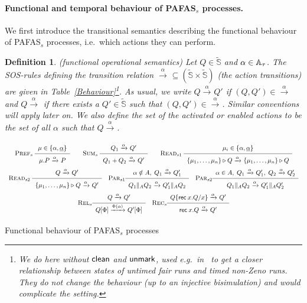 \documentclass[copyright,creativecommons]{eptcs}
\newtheorem{definition}[theorem]{Definition}
\def\name#1{\mbox{\sc #1}}
\def\sos#1#2{{\def\arraystretch{1.6}\begin{array}{c}#1\\\hline
#2\end{array}}}
\newcommand{\rec}{{\sf rec} \:}
\newcommand{\nar}[2]{\xrightarrow{#1}_{#2}}
\newcommand{\Sg}{\tilde{\SG}}
\newcommand{\SG}{{\mathbb S}}
\newcommand{\clean}{{\sf clean}}
\newcommand{\unlab}{{\sf unmark}}
\newcommand{\rop}{\triangleright}
\begin{document}
\paragraph{Functional and temporal behaviour of PAFAS$_s$ processes.}
\label{secTimedSem}
We first introduce the transitional semantics describing the functional
behaviour of PAFAS$_s$ processes, i.e.\ which actions they can perform.
\begin{definition}\label{PACTSOS}\rm({\em functional operational
semantics})
Let $Q\in \Sg$ and $\alpha \in {\mathbb A}_{\tau}$. The SOS-rules defining the transition
relation  $\nar{\alpha}{}\subseteq(\Sg \times \Sg)$ (the {\em action
transitions}) are given in Table~\ref{Behaviour}\footnote{We do here
without $\clean$ and $\unlab$, used e.g.\ in~\cite{CDV06} to get
a closer relationship between states of untimed fair runs and timed
non-Zeno runs. They do not change the behaviour (up to an injective
bisimulation) and would complicate the setting.}. As usual, we write
$Q\nar{\alpha}{}Q'$ if $(Q,Q')\in\nar{\alpha}{}$ and $Q\nar{\alpha}{}$ if
there exists a $Q'\in \Sg$ such that $(Q,Q')\in\nar{\alpha}{}$. Similar
conventions will apply later on. We also define the set of the {\em
activated} or enabled actions to be the set of all $\alpha$ such that
$Q \nar{\alpha}{}$.
\end{definition}

\vspace{-0.8cm}
\begin{table}[tbh]
\small
\[
\begin{array}{c}
\name{Pref$_s$}\; \sos{\mu\in\{\alpha, \underline{\alpha}\}}
{\mu.P \nar{\alpha}{}P}\qquad 
\name{Sum$_s$}\; \sos{Q_1\nar{\alpha}{}Q'}{Q_1+Q_2
\nar{\alpha}{} Q'}  \qquad 
\name{Read$_{s1}$}\; \sos{ \mu_i \in \{\alpha, \underline{\alpha}\}}
{\{\mu_1, \ldots, \mu_n\} \rop Q \nar{\alpha}{} \{\mu_1, \ldots,
\mu_n\} \rop Q} \\
\name{Read$_{s2}$}\; \sos{Q \nar{\alpha}{} Q'} {\{\mu_1, \ldots, \mu_n\}
\rop Q \nar{\alpha}{} Q'}  \quad 
\name{Par$_{s1}$} \sos{\alpha\notin A,\;Q_1\nar{\alpha}{}Q'_1}
{Q_1\|_A Q_2 \nar{\alpha}{} Q'_1\|_A Q_2}\quad
\name{Par$_{s2}$} \sos{\alpha\in A,\;Q_1\nar{\alpha}{}Q'_1,\;
Q_2\nar{\alpha}{}Q'_2}{Q_1\|_A Q_2 \nar{\alpha}{} Q'_1\|_A Q'_2}\\
\name{Rel$_s$} \sos{Q\nar{\alpha}{}Q'}
{Q[\Phi]\nar{\Phi(\alpha)}{}Q'[\Phi]}\quad
\name{Rec$_s$} \sos{Q \{\rec x.Q/x\} \nar{\alpha}{} Q'}
{\rec x.Q \nar{\alpha}{} Q'}\\
\end{array}\]
\caption{Functional behaviour of PAFAS$_s$ processes}
\label{Behaviour}
\end{table}
\end{document}
